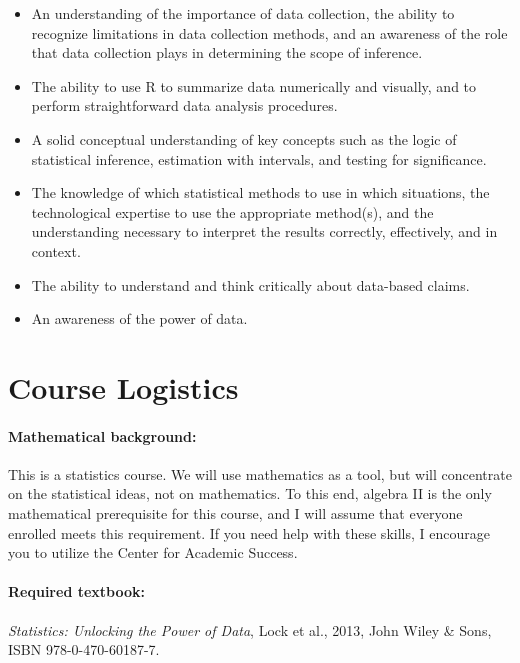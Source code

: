 \documentclass[11pt,]{article}
\providecommand{\tightlist}{%
  \setlength{\itemsep}{0pt}\setlength{\parskip}{0pt}}
\begin{document}
\begin{itemize}
\tightlist
\item
  An understanding of the importance of data collection, the ability to
  recognize limitations in data collection methods, and an awareness of
  the role that data collection plays in determining the scope of
  inference.
\item
  The ability to use R to summarize data numerically and visually, and
  to perform straightforward data analysis procedures.
\item
  A solid conceptual understanding of key concepts such as the logic of
  statistical inference, estimation with intervals, and testing for
  significance.
\item
  The knowledge of which statistical methods to use in which situations,
  the technological expertise to use the appropriate method(s), and the
  understanding necessary to interpret the results correctly,
  effectively, and in context.
\item
  The ability to understand and think critically about data-based
  claims.
\item
  An awareness of the power of data.
\end{itemize}

\section{Course Logistics}\label{course-logistics}

\paragraph{Mathematical background:}\label{mathematical-background}

This is a statistics course. We will use mathematics as a tool, but will
concentrate on the statistical ideas, not on mathematics. To this end,
algebra II is the only mathematical prerequisite for this course, and I
will assume that everyone enrolled meets this requirement. If you need
help with these skills, I encourage you to utilize the Center for
Academic Success.

\paragraph{Required textbook:}\label{required-textbook}

\emph{Statistics: Unlocking the Power of Data}, Lock et al., 2013, John
Wiley \& Sons, ISBN 978-0-470-60187-7.
\end{document}
